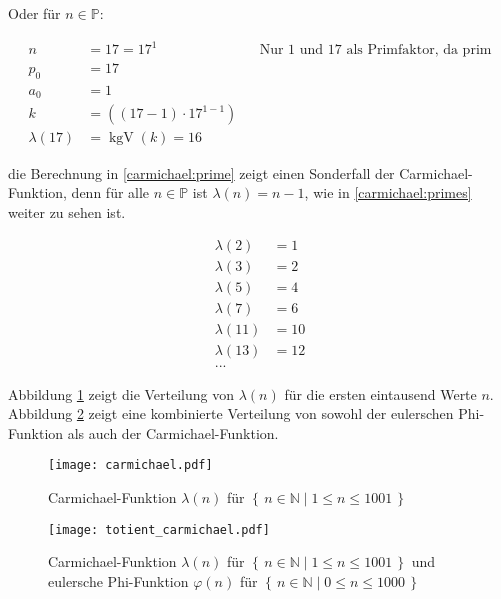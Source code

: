 Oder für $n \in \mathbb{P}$:

\begin{equation}
  \begin{aligned}
    n&=17=17^1 && \text{Nur 1 und 17 als Primfaktor, da prim}\\
    p_0&=17\\
    a_0&=1\\
    k&=((17-1) \cdot 17^{1-1})\\
    \lambda(17)&=\operatorname{kgV}(k)=16
  \end{aligned}
  \label{carmichael:prime}
\end{equation}

die Berechnung in \ref{carmichael:prime} zeigt einen Sonderfall der Carmichael-Funktion, denn für alle $n \in \mathbb{P}$ ist $\lambda(n)=n-1$, wie in \ref{carmichael:primes} weiter zu sehen ist.

\begin{equation}
  \begin{aligned}
    \lambda(2)&=1\\
    \lambda(3)&=2\\
    \lambda(5)&=4\\
    \lambda(7)&=6\\
    \lambda(11)&=10\\
    \lambda(13)&=12\\
    ...&
  \end{aligned}
  \label{carmichael:primes}
\end{equation}

Abbildung \ref{carmichael_dist} zeigt die Verteilung von $\lambda(n)$ für die ersten eintausend Werte $n$. Abbildung \ref{carmichael_totient} zeigt eine kombinierte Verteilung von sowohl der eulerschen Phi-Funktion als auch der Carmichael-Funktion.

\begin{figure}[H]
  \texttt{[image: carmichael.pdf]}
  \caption{Carmichael-Funktion $\lambda(n)$ für $\left\{\,n \in \mathbb{N}\mid 1 \le n \le 1001 \, \right\}$}
  \label{carmichael_dist}
\end{figure}

\begin{figure}[H]
  \texttt{[image: totient\_carmichael.pdf]}
  \caption{Carmichael-Funktion $\lambda(n)$ für $\left\{\,n \in \mathbb{N}\mid 1 \le n \le 1001 \, \right\}$ und eulersche Phi-Funktion $\varphi(n)$ für $\left\{\,n \in \mathbb{N}\mid 0 \le n \le 1000 \, \right\}$}
  \label{carmichael_totient}
\end{figure}
